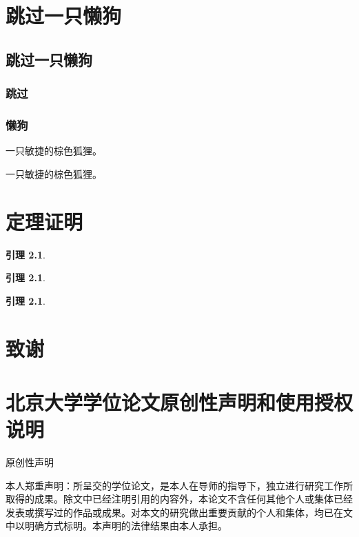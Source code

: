 \documentclass[UTF8,openany,a4paper]{ctexbook}
\newtheorem{lemma}[theorem]{引理}
\theoremstyle{definition}
\begin{document}
\chapter{跳过一只懒狗}
\zhlipsum[9]
\section{跳过一只懒狗}
\subsection{跳过}
\zhlipsum[8]
\subsection{懒狗}
\zhlipsum[10]

{ \sffamily 一只敏捷的棕色狐狸。} \cite{bax2005}
\zhlipsum[11]

{ \ttfamily 一只敏捷的棕色狐狸。} \cite{doumic2009}
\zhlipsum[12]




\appendix
\chapter{定理证明}
\begin{lemma}
    \zhlipsum[13]    
\end{lemma}
\begin{lemma}
    \zhlipsum[14]    
\end{lemma}
\begin{lemma}
    \zhlipsum[15]    
\end{lemma}
\chapter*{致谢}
\zhlipsum[16]

\chapter*{北京大学学位论文原创性声明和使用授权说明}
\begin{center}
\rmfamily 原创性声明
\end{center}

本人郑重声明：所呈交的学位论文，是本人在导师的指导下，独立进行研究工作所取得的成果。除文中已经注明引用的内容外，本论文不含任何其他个人或集体已经发表或撰写过的作品或成果。对本文的研究做出重要贡献的个人和集体，均已在文中以明确方式标明。本声明的法律结果由本人承担。
\bigskip
\end{document}
